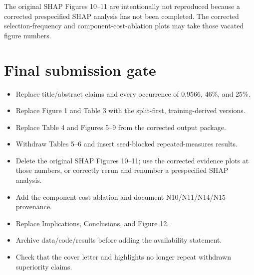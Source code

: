 \documentclass[10pt]{article}
\begin{document}
The original SHAP Figures 10--11 are intentionally not reproduced because a corrected prespecified SHAP analysis has not been completed. The corrected selection-frequency and component-cost-ablation plots may take those vacated figure numbers.

\section{Final submission gate}

\begin{itemize}[leftmargin=18pt,label=$\square$,itemsep=4pt]
\item Replace title/abstract claims and every occurrence of 0.9566, 46\%, and 25\%.
\item Replace Figure 1 and Table 3 with the split-first, training-derived versions.
\item Replace Table 4 and Figures 5--9 from the corrected output package.
\item Withdraw Tables 5--6 and insert seed-blocked repeated-measures results.
\item Delete the original SHAP Figures 10--11; use the corrected evidence plots at those numbers, or correctly rerun and renumber a prespecified SHAP analysis.
\item Add the component-cost ablation and document N10/N11/N14/N15 provenance.
\item Replace Implications, Conclusions, and Figure 12.
\item Archive data/code/results before adding the availability statement.
\item Check that the cover letter and highlights no longer repeat withdrawn superiority claims.
\end{itemize}
\end{document}
